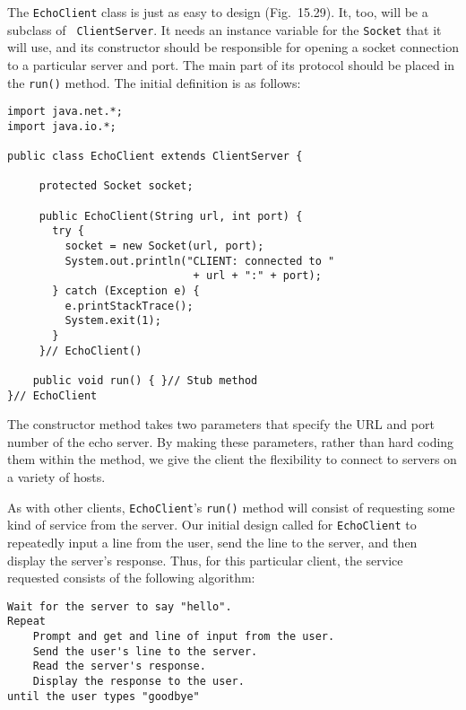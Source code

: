 {\noindent The {\tt EchoClient} class is just as easy to design
(Fig.~15.29).  It, too, will be a subclass of {\tt
ClientServer}. It needs an instance variable for the {\tt Socket} that
it will use, and its constructor should be responsible for opening a
socket connection to a particular server and port.  The main part of
its protocol should be placed in the {\tt run()} method.  The initial
definition is as follows:


\begin{jjjlisting}
\begin{lstlisting}
import java.net.*;
import java.io.*;

public class EchoClient extends ClientServer {

     protected Socket socket;

     public EchoClient(String url, int port) {
       try {
         socket = new Socket(url, port);
         System.out.println("CLIENT: connected to " 
                             + url + ":" + port);
       } catch (Exception e) {
         e.printStackTrace();
         System.exit(1);
       }
     }// EchoClient()

    public void run() { }// Stub method
}// EchoClient
\end{lstlisting}
\end{jjjlisting}

\noindent The constructor method takes two
parameters that specify the URL and port number of the echo server.  By
making these parameters, rather than hard coding them within the
method, we give the client the flexibility to connect to servers on a
variety of hosts.

As with other clients, {\tt EchoClient}'s {\tt run()} method will
consist of requesting some kind of service from the server.  Our
initial design called for {\tt EchoClient} to repeatedly input a line
from the user, send the line to the server, and then display the
server's response.   Thus, for this particular client, the
service requested consists of the following algorithm:

\begin{jjjlisting}
\begin{lstlisting}
Wait for the server to say "hello".
Repeat
    Prompt and get and line of input from the user.
    Send the user's line to the server.
    Read the server's response.
    Display the response to the user.
until the user types "goodbye"
\end{lstlisting}
\end{jjjlisting}

}
